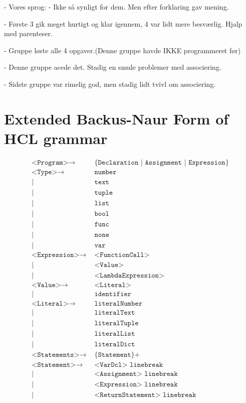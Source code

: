 - Vores sprog: 
- Ikke så synligt for dem. Men efter forklaring gav mening.

- Første 3 gik meget hurtigt og klar igennem, 4 var lidt mere besværlig. Hjalp med parenteser.

- Gruppe løste alle 4 opgaver.(Denne gruppe havde IKKE programmeret før)

- Denne gruppe acede det. Stadig en smule problemer med associering.

- Sidste gruppe var rimelig god, men stadig lidt tvivl om associering.

\section{Extended Backus-Naur Form of HCL grammar}
\begin{align*}
	\texttt{<Program>}\to & \texttt{ \{Declaration | Assignment | Expression\}}\\
	\texttt{<Type>}\to & \texttt{ number}\\
	| & \texttt{ text}\\
	| & \texttt{ tuple}\\
	| & \texttt{ list}\\
	| & \texttt{ bool}\\
	| & \texttt{ func}\\
	| & \texttt{ none}\\
	| & \texttt{ var}\\
	\texttt{<Expression>}\to & \texttt{ <FunctionCall>}\\
	| & \texttt{ <Value>}\\
	| & \texttt{ <LambdaExpression>}\\
	\texttt{<Value>}\to & \texttt{ <Literal>}\\
	| & \texttt{ identifier}\\
	\texttt{<Literal>}\to & \texttt{ literalNumber}\\
	| & \texttt{ literalText}\\
	| & \texttt{ literalTuple}\\
	| & \texttt{ literalList}\\
	| & \texttt{ literalDict}\\
	\texttt{<Statements>}\to & \texttt{ \{Statement\}+}\\
	\texttt{<Statement>}\to & \texttt{ <VarDcl> linebreak}\\
	| & \texttt{ <Assignment> linebreak}\\
	| & \texttt{ <Expression> linebreak}\\
	| & \texttt{ <ReturnStatement> linebreak}\\

\end{align*}
